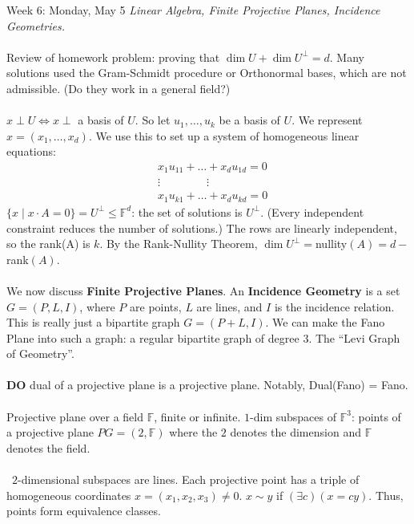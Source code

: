 \documentclass[12pt]{article}
\theoremstyle{remark}
\newcommand{\F}{\mathbb{F}}
\begin{document}
\newpage
\label{16}\begin{section}{Week 6: Monday, May 5}
\indent\textit{Linear Algebra, Finite Projective Planes, Incidence Geometries.}\\\\
Review of homework problem: proving that $\dim U + \dim U^\perp = d$. Many solutions used the Gram-Schmidt procedure or Orthonormal bases, which are not admissible. (Do they work in a general field?)
\\\\
$x \perp U \Leftrightarrow x \perp$ a basis of $U$. So let $u_1,\ldots,u_k$ be a basis of $U$. We represent $x = (x_1,\ldots,x_d)$. We use this to set up a system of homogeneous linear equations: 
\begin{align*}
&x_1u_{11} + \ldots + x_du_{1d} = 0 \\
&\vdots \phantom{ + ldots+} \vdots \\
&x_1u_{k1} + \ldots + x_du_{kd} = 0
\end{align*}
$\{x \mid x \cdot A = 0 \} = U^\perp \leqslant \F^d$: the set of solutions is $U^\perp$. (Every independent constraint reduces the number of solutions.) The rows are linearly independent, so the rank(A) is $k$. By the Rank-Nullity Theorem, $\dim U^\perp = $nullity$(A) = d - $rank$(A)$. \checkmark
\\\\
We now discuss \textbf{Finite Projective Planes}. An \textbf{Incidence Geometry} is a set $G = (P,L,I)$, where $P$ are points, $L$ are lines, and $I$ is the incidence relation. This is really just a bipartite graph $G = (P+L,I)$. We can make the Fano Plane into such a graph: a regular bipartite graph of degree $3$. The ``Levi Graph of Geometry''.
\\\\
\textbf{DO} dual of a projective plane is a projective plane. Notably, Dual(Fano) = Fano.
\\\\
Projective plane over a field $\F$, finite or infinite. $1$-dim subspaces of $\F^3$: points of a projective plane $PG = (2,\F)$ where the $2$ denotes the dimension and $\F$ denotes the field. 
\\\\\
$2$-dimensional subspaces are lines. 
Each projective point has a triple of homogeneous coordinates $x = (x_1,x_2,x_3) \neq 0$. $x \sim y$ if $(\exists c)(x = cy)$. Thus, points form equivalence classes.
\end{section}
\newpage
\end{document}
